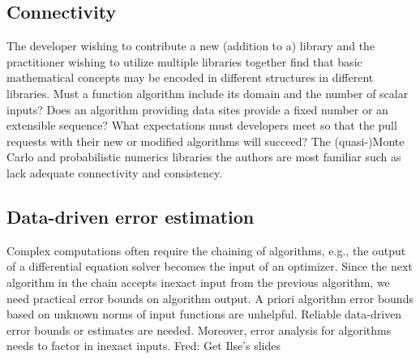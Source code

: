 \documentclass{amsart}
\newcommand{\FJHNote}[1]{{\color{blue}Fred: #1}}
\begin{document}
\subsection{Connectivity} 
The developer wishing to contribute a new (addition to a) library and the practitioner wishing to utilize multiple libraries together find that basic mathematical concepts may be encoded in different structures in different libraries.  Must a function algorithm include its domain and the number of scalar inputs?  Does an algorithm providing data sites provide a fixed number or an extensible sequence?  What expectations must developers meet so that the pull requests with their new or modified algorithms will succeed? The (quasi-)Monte Carlo and probabilistic numerics libraries  the authors are most familiar such as \cite{QMCPy2020a,SciPyQMC,STAN,probnum} lack  adequate connectivity and consistency.  

\subsection{Data-driven error estimation} 
Complex computations often require the chaining of algorithms, e.g., the output of a differential equation solver becomes the input of an optimizer.  Since the next algorithm in the chain accepts inexact input from the previous algorithm, 
we need practical error bounds on algorithm output. A priori algorithm error bounds based on unknown norms of input functions are unhelpful.  Reliable data-driven error bounds or estimates are needed. Moreover, error analysis for algorithms needs to factor in inexact inputs.
\FJHNote{Get Ilse's slides}
\end{document}
